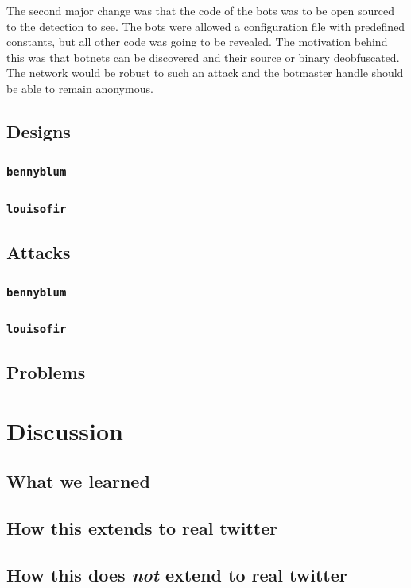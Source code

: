 \documentclass[11pt, oneside]{article} %
\numberwithin{equation}{section} %
\numberwithin{figure}{section} %
\numberwithin{table}{section} %
\renewcommand{\c}[1]{\texttt{#1}}
\newcommand{\teambb}{\c{bennyblum}}
\newcommand{\teamol}{\c{louisofir}}
\begin{document}
		The second major change was that the code of the bots was to be open sourced to the detection to see. The bots were allowed a configuration file with predefined constants, but all other code was going to be revealed. The motivation behind this was that botnets can be discovered and their source or binary deobfuscated. The network would be robust to such an attack and the botmaster handle should be able to remain anonymous. \\

		
	\subsection{Designs}
		\subsubsection{\teambb}
		\subsubsection{\teamol}
	\subsection{Attacks}
		\subsubsection{\teambb}
		\subsubsection{\teamol}
	\subsection{Problems}

\section{Discussion}

	\subsection{What we learned}
	\subsection{How this extends to real twitter}
	\subsection{How this does \textit{not} extend to real twitter}
\end{document}
